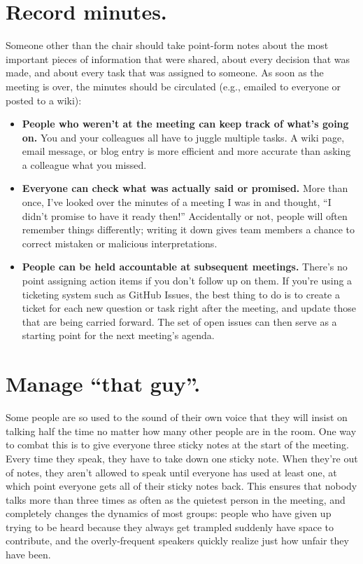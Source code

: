 \documentclass[10pt,letterpaper]{article}
\newcommand{\rulemajor}[1]{\section{#1}}
\begin{document}
\rulemajor{Record minutes.}

Someone other than the chair should take point-form notes about the most
important pieces of information that were shared, about every decision that was
made, and about every task that was assigned to someone.  As soon as the meeting
is over, the minutes should be circulated (e.g., emailed to everyone or posted
to a wiki):

\begin{itemize}

\item
  \textbf{People who weren't at the meeting can keep track of what's going on.}
  You and your colleagues all have to juggle multiple tasks.  A wiki page, email
  message, or blog entry is more efficient and more accurate than asking a
  colleague what you missed.

\item
  \textbf{Everyone can check what was actually said or promised.} More than
  once, I've looked over the minutes of a meeting I was in and thought, ``I
  didn't promise to have it ready then!''  Accidentally or not, people will
  often remember things differently; writing it down gives team members a chance
  to correct mistaken or malicious interpretations.

\item
  \textbf{People can be held accountable at subsequent meetings.} There's no
  point assigning action items if you don't follow up on them.  If you're using
  a ticketing system such as GitHub Issues, the best thing to do is to create a
  ticket for each new question or task right after the meeting, and update those
  that are being carried forward.  The set of open issues can then serve as a
  starting point for the next meeting's agenda.

\end{itemize}
  
\rulemajor{Manage ``that guy''.}

Some people are so used to the sound of their own voice that they will insist on
talking half the time no matter how many other people are in the room. One way
to combat this is to give everyone three sticky notes at the start of the
meeting. Every time they speak, they have to take down one sticky note. When
they're out of notes, they aren't allowed to speak until everyone has used at
least one, at which point everyone gets all of their sticky notes back. This
ensures that nobody talks more than three times as often as the quietest person
in the meeting, and completely changes the dynamics of most groups: people who
have given up trying to be heard because they always get trampled suddenly have
space to contribute, and the overly-frequent speakers quickly realize just how
unfair they have been.
\end{document}
